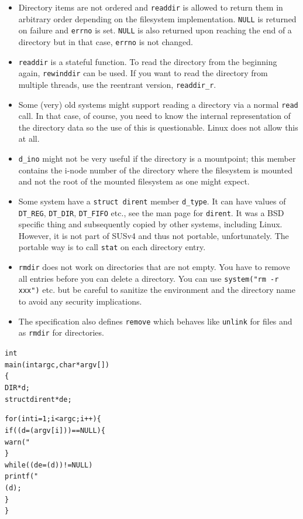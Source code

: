 \begin{itemize}
\item Directory items are not ordered and
\texttt{readdir} is allowed to return them in arbitrary order depending on the
filesystem implementation.  \texttt{NULL} is returned on failure
and \texttt{errno} is set.  \texttt{NULL} is also returned upon reaching the end
of a directory but in that case, \texttt{errno} is not changed.
\item \texttt{readdir} is a stateful function.  To read the directory from the
beginning again, \texttt{rewinddir} can be used.  If you want to read the
directory from multiple threads, use the reentrant version, \texttt{readdir\_r}.
\item Some (very) old systems might support reading a directory via a normal
\texttt{read} call.  In that case, of course, you need to know the internal
representation of the directory data so the use of this is questionable.  Linux
does not allow this at all.
\item \texttt{d\_ino} might not be very useful if the directory is a
mountpoint; this member contains the i-node number of the directory where the
filesystem is mounted and not the root of the mounted filesystem as one might
expect.
\item {} Some system have a \texttt{struct dirent} member
\texttt{d\_type}.  It can have values of \texttt{DT\_REG}, \texttt{DT\_DIR},
\texttt{DT\_FIFO} etc., see the man page for \texttt{dirent}.  It was a BSD
specific thing and subsequently copied by other systems, including Linux.
However, it is not part of SUSv4 and thus not portable, unfortunately.
The portable way is to call \texttt{stat} on each directory entry.
\item \texttt{rmdir} does not work on directories that are not empty.  You have
to remove all entries before you can delete a directory.  You can use
\texttt{system("rm -r xxx")} etc. but be careful to sanitize the environment and
the directory name to avoid any security implications.
\item {} The specification also defines \texttt{remove} which
behaves like \texttt{unlink} for files and as \texttt{rmdir} for directories.
\end{itemize}


\begin{slide}
\begin{alltt}
int
main(int argc, char *argv[])
\{
    DIR *d;
    struct dirent *de;

    for (int i = 1; i < argc; i++) \{
        if ((d = (argv[i])) == NULL) \{
                warn("%
        \}
        while ((de = (d)) != NULL)
            printf("%
        (d);
    \}
\}
\end{alltt}
\end{slide}

